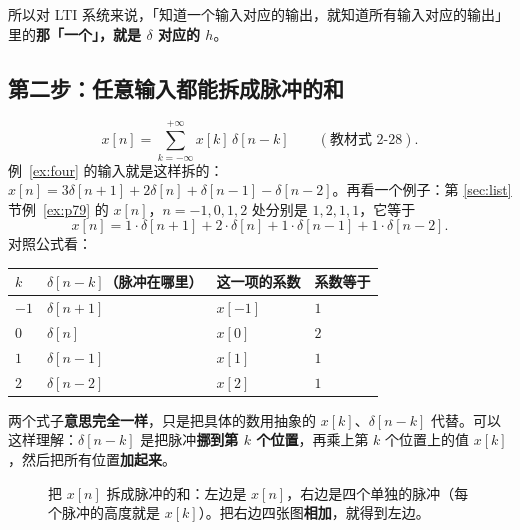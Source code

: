 \documentclass[UTF8,a4paper,11pt]{ctexart}
\newcommand{\stemr}[7]{%
  \begin{scope}[shift={(#1,#2)},x=0.38cm,y=#5 cm]
    \pgfmathtruncatemacro{\len}{dim({#4,0})-1}%
    \pgfmathtruncatemacro{\ymax}{max(#4,#4)}%
    \pgfmathtruncatemacro{\ymin}{min(#4,#4)}%
    \pgfmathsetmacro{\ybot}{min(-0.45/#5,\ymin-0.12/#5)}%
    \draw[->] ({#6-0.5},0) -- ({#7+0.7},0) node[right,font=\tiny] {$n$};
    \draw[->] (0,\ybot) -- (0,{1.9/#5});
    \foreach \v [count=\k from 0] in {#4}{%
      \pgfmathtruncatemacro{\nn}{#3+\k}
      \draw[thick,blue!60!black] (\nn,0) -- (\nn,\v);
      \node[circle,fill=blue!60!black,inner sep=1.1pt] at (\nn,\v) {};
      \ifnum\nn<0 \def\side{east}\else\def\side{west}\fi
      \ifnum\v>0 \node[font=\scriptsize,anchor=south \side,inner sep=1pt] at (\nn,\v) {\v};\fi
      \ifnum\v<0 \node[font=\scriptsize,anchor=north \side,inner sep=1pt] at (\nn,\v) {\v};\fi}%
    \foreach \t in {#6,...,#7}{%
      \pgfmathtruncatemacro{\kk}{\t-(#3)}%
      \def\vv{0}%
      \ifnum\kk>-1 \ifnum\kk<\len\relax \pgfmathtruncatemacro{\vv}{{#4,0}[\kk]}\fi\fi
      \draw (\t,0) -- (\t,{-0.09/#5});
      \ifnum\vv<0
        \node[font=\tiny,gray!60!black,anchor=south,fill=white,inner sep=0.6pt] at (\t,{0.04/#5}) {$\t$};
      \else
        \node[font=\tiny,gray!60!black,anchor=north,fill=white,inner sep=0.6pt] at (\t,{-0.09/#5}) {$\t$};
      \fi}%
    \ifnum\ymax>0
      \draw (0,\ymax) -- (-0.2,\ymax) node[anchor=east,font=\tiny,gray!60!black,fill=white,inner sep=0.6pt] {$\ymax$};
    \fi
    \pgfmathtruncatemacro{\showmin}{(\ymin*#5)<-0.33}%
    \ifnum\showmin=1
      \draw (0,\ymin) -- (-0.2,\ymin) node[anchor=east,font=\tiny,gray!60!black,fill=white,inner sep=0.6pt] {$\ymin$};
    \fi
  \end{scope}}
\newcommand{\stemat}[5]{\stemr{#1}{#2}{#3}{#4}{#5}{-3}{5}}
\newcounter{ex}[section]
\begin{document}
所以对 LTI 系统来说，「知道一个输入对应的输出，就知道所有输入对应的输出」里的\textbf{那「一个」，就是 $\delta$ 对应的 $h$}。

\subsection{第二步：任意输入都能拆成脉冲的和}
\[
x[n]=\sum_{k=-\infty}^{+\infty}x[k]\,\delta[n-k]\qquad(\text{教材式 2-28}).
\]
例~\ref{ex:four} 的输入就是这样拆的：$x[n]=3\delta[n+1]+2\delta[n]+\delta[n-1]-\delta[n-2]$。再看一个例子：第 \ref{sec:list} 节例~\ref{ex:p79} 的 $x[n]$，$n=-1,0,1,2$ 处分别是 $1,2,1,1$，它等于
\[
x[n]=1\cdot\delta[n+1]+2\cdot\delta[n]+1\cdot\delta[n-1]+1\cdot\delta[n-2].
\]
对照公式看：

\begin{center}
\begin{tabular}{@{}llll@{}}
\toprule
$k$ & $\delta[n-k]$（脉冲在哪里） & 这一项的系数 & 系数等于\\
\midrule
$-1$ & $\delta[n+1]$ & $x[-1]$ & $1$\\
$0$ & $\delta[n]$ & $x[0]$ & $2$\\
$1$ & $\delta[n-1]$ & $x[1]$ & $1$\\
$2$ & $\delta[n-2]$ & $x[2]$ & $1$\\
\bottomrule
\end{tabular}
\end{center}
两个式子\textbf{意思完全一样}，只是把具体的数用抽象的 $x[k]$、$\delta[n-k]$ 代替。可以这样理解：$\delta[n-k]$ 是把脉冲\textbf{挪到第 $k$ 个位置}，再乘上第 $k$ 个位置上的值 $x[k]$，然后把所有位置\textbf{加起来}。

\begin{figure}[H]
\centering
{}
\caption{把 $x[n]$ 拆成脉冲的和：左边是 $x[n]$，右边是四个单独的脉冲（每个脉冲的高度就是 $x[k]$）。把右边四张图\textbf{相加}，就得到左边。}
\end{figure}
\end{document}
